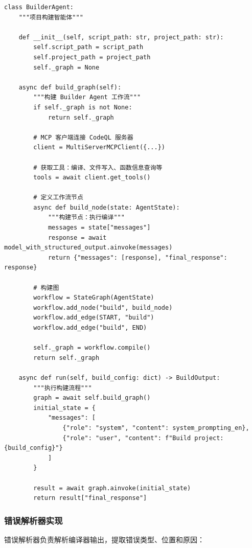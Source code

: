 \begin{lstlisting}[style=Python,abovecaptionskip=0pt,belowcaptionskip=0pt]
class BuilderAgent:
    """项目构建智能体"""
    
    def __init__(self, script_path: str, project_path: str):
        self.script_path = script_path
        self.project_path = project_path
        self._graph = None
    
    async def build_graph(self):
        """构建 Builder Agent 工作流"""
        if self._graph is not None:
            return self._graph
        
        # MCP 客户端连接 CodeQL 服务器
        client = MultiServerMCPClient({...})
        
        # 获取工具：编译、文件写入、函数信息查询等
        tools = await client.get_tools()
        
        # 定义工作流节点
        async def build_node(state: AgentState):
            """构建节点：执行编译"""
            messages = state["messages"]
            response = await model_with_structured_output.ainvoke(messages)
            return {"messages": [response], "final_response": response}
        
        # 构建图
        workflow = StateGraph(AgentState)
        workflow.add_node("build", build_node)
        workflow.add_edge(START, "build")
        workflow.add_edge("build", END)
        
        self._graph = workflow.compile()
        return self._graph
    
    async def run(self, build_config: dict) -> BuildOutput:
        """执行构建流程"""
        graph = await self.build_graph()
        initial_state = {
            "messages": [
                {"role": "system", "content": system_prompting_en},
                {"role": "user", "content": f"Build project: {build_config}"}
            ]
        }
        
        result = await graph.ainvoke(initial_state)
        return result["final_response"]
\end{lstlisting}

\subsubsection{错误解析器实现}

错误解析器负责解析编译器输出，提取错误类型、位置和原因：


